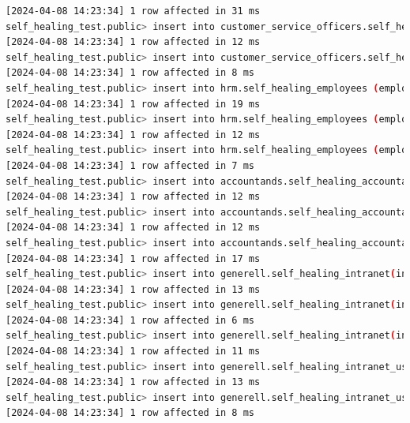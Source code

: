 \begin{flushleft}
\begin{lstlisting}[language=bash, caption=yugabyteDB - Evaluation-Testing,captionpos=b,label={lst:yugabytedb-evaluation-testing},breaklines=true]
[2024-04-08 14:23:34] 1 row affected in 31 ms
self_healing_test.public> insert into customer_service_officers.self_healing_accounts (account_id, firstname, lastname, birthday) VALUES (500, 'k', 'l', '01.01.2003')
[2024-04-08 14:23:34] 1 row affected in 12 ms
self_healing_test.public> insert into customer_service_officers.self_healing_accounts (account_id, firstname, lastname, birthday) VALUES (600, 'm', 'n', '01.01.2001')
[2024-04-08 14:23:34] 1 row affected in 8 ms
self_healing_test.public> insert into hrm.self_healing_employees (employees_id, firstname, lastname, birthday) VALUES (400, 'i', 'j', '01.01.2005')
[2024-04-08 14:23:34] 1 row affected in 19 ms
self_healing_test.public> insert into hrm.self_healing_employees (employees_id, firstname, lastname, birthday) VALUES (500, 'k', 'l', '01.01.2003')
[2024-04-08 14:23:34] 1 row affected in 12 ms
self_healing_test.public> insert into hrm.self_healing_employees (employees_id, firstname, lastname, birthday) VALUES (600, 'm', 'n', '01.01.2001')
[2024-04-08 14:23:34] 1 row affected in 7 ms
self_healing_test.public> insert into accountands.self_healing_accountand_protocol (acc_protocol_id, description, protocol_date, employees_id, rapport)  values (400, 'bla', '07.04.2024', 200, 'blabla')
[2024-04-08 14:23:34] 1 row affected in 12 ms
self_healing_test.public> insert into accountands.self_healing_accountand_protocol (acc_protocol_id, description, protocol_date, employees_id, rapport)  values (500, 'yada', '07.04.2024', 600, 'ydayadyada')
[2024-04-08 14:23:34] 1 row affected in 12 ms
self_healing_test.public> insert into accountands.self_healing_accountand_protocol (acc_protocol_id, description, protocol_date, employees_id, rapport)  values (1000, 'something', '07.04.2024', 300, 'something')
[2024-04-08 14:23:34] 1 row affected in 17 ms
self_healing_test.public> insert into generell.self_healing_intranet(intranet_id, content) VALUES (200, 'yadada')
[2024-04-08 14:23:34] 1 row affected in 13 ms
self_healing_test.public> insert into generell.self_healing_intranet(intranet_id, content) VALUES (600, 'bla bla')
[2024-04-08 14:23:34] 1 row affected in 6 ms
self_healing_test.public> insert into generell.self_healing_intranet(intranet_id, content) VALUES (900, 'talking and talking')
[2024-04-08 14:23:34] 1 row affected in 11 ms
self_healing_test.public> insert into generell.self_healing_intranet_users(intranet_user_id, employees_id) values(400, 400)
[2024-04-08 14:23:34] 1 row affected in 13 ms
self_healing_test.public> insert into generell.self_healing_intranet_users(intranet_user_id, employees_id) values(500, 500)
[2024-04-08 14:23:34] 1 row affected in 8 ms

\end{lstlisting}
\end{flushleft}
